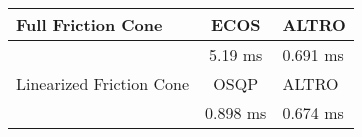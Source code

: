 \begin{tabular}{lcl}
\toprule 
Full Friction Cone & ECOS & ALTRO \\
\midrule 
 & 5.19 ms & 0.691 ms \\
\toprule 
Linearized Friction Cone & OSQP & ALTRO \\
\midrule 
 & 0.898 ms & 0.674 ms \\
\bottomrule 
\end{tabular}
